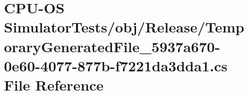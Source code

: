 \hypertarget{_c_p_u-_o_s_01_simulator_tests_2obj_2_release_2_temporary_generated_file__5937a670-0e60-4077-877b-f7221da3dda1_8cs}{}\section{C\+P\+U-\/\+O\+S Simulator\+Tests/obj/\+Release/\+Temporary\+Generated\+File\+\_\+5937a670-\/0e60-\/4077-\/877b-\/f7221da3dda1.cs File Reference}
\label{_c_p_u-_o_s_01_simulator_tests_2obj_2_release_2_temporary_generated_file__5937a670-0e60-4077-877b-f7221da3dda1_8cs}
